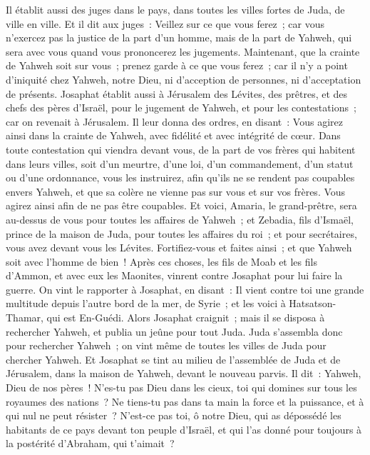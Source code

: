 \begin{multicols}{2}
Il établit aussi des juges dans le pays, dans toutes les villes fortes de Juda, de ville en ville.
Et il dit aux juges~: Veillez sur ce que vous ferez~; car vous n'exercez pas la justice de la part d'un homme, mais de la part de Yahweh, qui sera avec vous quand vous prononcerez les jugements.
Maintenant, que la crainte de Yahweh soit sur vous~; prenez garde à ce que vous ferez~; car il n'y a point d'iniquité chez Yahweh, notre Dieu, ni d'acception de personnes, ni d'acceptation de présents. 
Josaphat établit aussi à Jérusalem des Lévites, des prêtres, et des chefs des pères d'Israël, pour le jugement de Yahweh, et pour les contestations~; car on revenait à Jérusalem.
Il leur donna des ordres, en disant~: Vous agirez ainsi dans la crainte de Yahweh, avec fidélité et avec intégrité de cœur.
Dans toute contestation qui viendra devant vous, de la part de vos frères qui habitent dans leurs villes, soit d'un meurtre, d'une loi, d'un commandement, d'un statut ou d'une ordonnance, vous les instruirez, afin qu'ils ne se rendent pas coupables envers Yahweh, et que sa colère ne vienne pas sur vous et sur vos frères. Vous agirez ainsi afin de ne pas être coupables.
Et voici, Amaria, le grand-prêtre, sera au-dessus de vous pour toutes les affaires de Yahweh~; et Zebadia, fils d'Ismaël, prince de la maison de Juda, pour toutes les affaires du roi~; et pour secrétaires, vous avez devant vous les Lévites. Fortifiez-vous et faites ainsi~; et que Yahweh soit avec l'homme de bien~!
\VerseOne{}Après ces choses, les fils de Moab et les fils d'Ammon, et avec eux les Maonites, vinrent contre Josaphat pour lui faire la guerre.
On vint le rapporter à Josaphat, en disant~: Il vient contre toi une grande multitude depuis l'autre bord de la mer, de Syrie~; et les voici à Hatsatson-Thamar, qui est En-Guédi.
Alors Josaphat craignit~; mais il se disposa à rechercher Yahweh, et publia un jeûne pour tout Juda.
Juda s'assembla donc pour rechercher Yahweh~; on vint même de toutes les villes de Juda pour chercher Yahweh.
Et Josaphat se tint au milieu de l'assemblée de Juda et de Jérusalem, dans la maison de Yahweh, devant le nouveau parvis.
Il dit~: Yahweh, Dieu de nos pères~! N'es-tu pas Dieu dans les cieux, toi qui domines sur tous les royaumes des nations~? Ne tiens-tu pas dans ta main la force et la puissance, et à qui nul ne peut résister~?
N'est-ce pas toi, ô notre Dieu, qui as dépossédé les habitants de ce pays devant ton peuple d'Israël, et qui l'as donné pour toujours à la postérité d'Abraham, qui t'aimait~?

\end{multicols}
